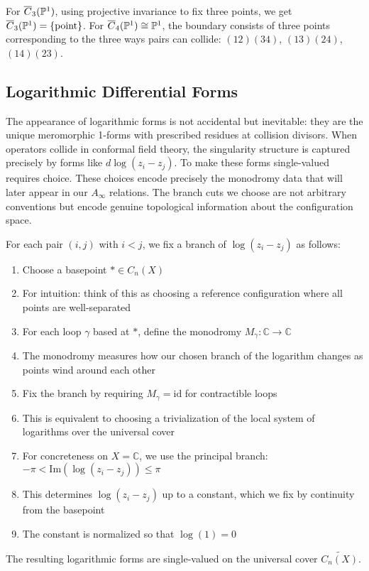 \begin{example}
For $\overline{C}_3(\mathbb{P}^1)$, using projective invariance to fix three points, we get $\overline{C}_3(\mathbb{P}^1) = \{\text{point}\}$. For $\overline{C}_4(\mathbb{P}^1) \cong \mathbb{P}^1$, the boundary consists of three points corresponding to the three ways pairs can collide: $(12)(34)$, $(13)(24)$, $(14)(23)$.
\end{example}
 
\subsection{Logarithmic Differential Forms}

\begin{remark}
The appearance of logarithmic forms is not accidental but inevitable: they are the unique meromorphic 1-forms with prescribed residues at collision divisors. When operators collide in conformal field theory, the singularity structure is captured precisely by forms like $d\log(z_i - z_j)$. To make these forms single-valued requires choice. These choices encode precisely the monodromy data that will later appear in our $A_\infty$ relations. The branch cuts we choose are not arbitrary conventions but encode genuine topological information about the configuration space.
\end{remark}


\begin{definition}
For each pair $(i,j)$ with $i < j$, we fix a branch of $\log(z_i - z_j)$ as follows:
\begin{enumerate}
\item Choose a basepoint $* \in C_n(X)$
\item For intuition: think of this as choosing a reference configuration where all points are well-separated

\item For each loop $\gamma$ based at $*$, define the monodromy $M_\gamma: \mathbb{C} \to \mathbb{C}$
\item The monodromy measures how our chosen branch of the logarithm changes as points wind around each other

\item Fix the branch by requiring $M_\gamma = \text{id}$ for contractible loops
\item This is equivalent to choosing a trivialization of the local system of logarithms over the universal cover
\item For concreteness on $X = \mathbb{C}$, we use the principal branch: $-\pi < \text{Im}(\log(z_i - z_j)) \leq \pi$

\item This determines $\log(z_i - z_j)$ up to a constant, which we fix by continuity from the basepoint
\item The constant is normalized so that $\log(1) = 0$
\end{enumerate}
The resulting logarithmic forms are single-valued on the universal cover $\widetilde{C_n(X)}$.
\end{definition}

